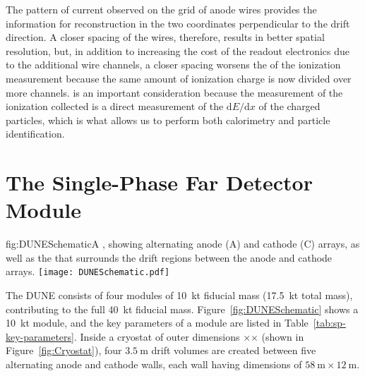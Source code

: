 The pattern of current observed on the grid of anode wires provides the information for reconstruction in the two coordinates perpendicular to the drift direction. A closer spacing of the wires, therefore, results in better spatial resolution, but, in addition to increasing the cost of the readout electronics due to the additional wire channels, a closer spacing worsens the  of the ionization measurement because the same amount of ionization charge is now divided over more channels.  is an important consideration because the measurement of the ionization collected is a direct measurement of the $\mathrm{d}E/\mathrm{d}x$ of the charged particles, which is what allows us to perform both calorimetry and particle identification.

\section{The  Single-Phase Far Detector Module}
\label{sec:fdsp-exec-dunefd}

\begin{dunefigure}{fig:DUNESchematic}{A \nominalmodsize {}  , showing alternating anode (A) and cathode (C) arrays, as well as the  that surrounds the drift regions between the anode and cathode arrays.}
\texttt{[image: DUNESchematic.pdf]}
\end{dunefigure}

The DUNE   consists of four modules of \SI{10}{\kilo\tonne} fiducial mass (\SI{17.5}{\kilo\tonne} total mass), contributing to the full \SI{40}{\kilo\tonne}  fiducial mass. Figure~\ref{fig:DUNESchematic} shows a \SI{10}{\kilo\tonne} module, and the key parameters of a  module are listed in Table~\ref{tab:sp-key-parameters}. Inside a cryostat of outer dimensions %
\cryostatlen$\times$\cryostatht$\times$\cryostatwdth
 (shown in Figure~\ref{fig:Cryostat}), four $\SI{3.5}{\meter}$ drift volumes are created between five alternating anode and cathode walls, each wall having dimensions of $\SI{58}{\meter}\times \SI{12}{\meter}$.


